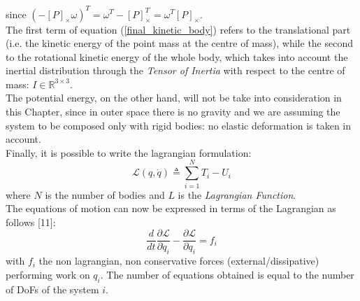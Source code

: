 \documentclass[a4paper,12pt,oneside]{report}
\begin{document}
since $(-[P]_{\times}\omega)^T=\omega^T-[P]_{\times}^T=\omega^T[P]_{\times}$.\\
The first term of equation (\ref{final_kinetic_body}) refers to the translational part (i.e. the kinetic energy of the point mass at the centre of mass), while the second to the rotational kinetic energy of the whole body, which takes into account the inertial distribution through the \textit{Tensor of Inertia} with respect to the centre of mass: $I \in \mathbb{R}^{3\times 3}$.\\

The potential energy, on the other hand, will not be take into consideration in this Chapter, since in outer space there is no gravity and we are assuming the system to be composed only with rigid bodies: no elastic deformation is taken in account.\\

Finally, it is possible to write the lagrangian formulation:
\begin{equation}
  \mathcal{L} (q,\dot{q}) \triangleq \sum_{i=1}^NT_i-U_i
\label{energy_sum}
\end{equation}
where $N$ is the number of bodies and $L$ is the \textit{Lagrangian Function}.\\
The equations of motion can now be expressed in terms of the Lagrangian as follows [11]:
\begin{equation}
  \frac{d}{dt}\frac{\partial \mathcal{L} }{\partial \dot{q}_i}-\frac{\partial \mathcal{L} }{\partial q_i}=f_i
  \label{lagrangian} 
\end{equation}
with $f_i$ the non lagrangian, non conservative forces (external/dissipative) performing work on $q_i$. The number of equations obtained is equal to the number of DoFs of the system $i$.\\
\end{document}
